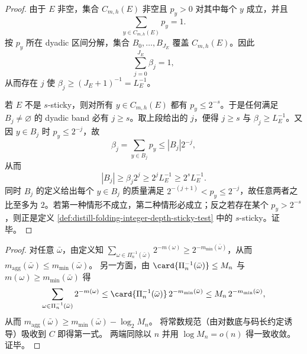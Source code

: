 \begin{proof}
由于 \(E\) 非空，集合 \(C_{m,h}(E)\) 非空且 \(p_y>0\) 对其中每个 \(y\) 成立，并且
\[
\sum_{y\in C_{m,h}(E)}p_y=1.
\]
按 \(p_y\) 所在 dyadic 区间分解，集合 \(B_0,\ldots,B_{J_E}\) 覆盖 \(C_{m,h}(E)\)。因此
\[
\sum_{j=0}^{J_E}\beta_j=1,
\]
从而存在 \(j\) 使 \(\beta_j\ge (J_E+1)^{-1}=L_E^{-1}\)。

若 \(E\) 不是 \(s\)-sticky，则对所有 \(y\in C_{m,h}(E)\) 都有 \(p_y\le2^{-s}\)。于是任何满足 \(B_j\ne\varnothing\) 的 dyadic band 必有 \(j\ge s\)。取上段给出的 \(j\)，便得 \(j\ge s\) 与 \(\beta_j\ge L_E^{-1}\)。又因 \(y\in B_j\) 时 \(p_y\le2^{-j}\)，故
\[
\beta_j=\sum_{y\in B_j}p_y\le |B_j|2^{-j},
\]
从而
\[
|B_j|\ge \beta_j2^j\ge 2^jL_E^{-1}\ge 2^sL_E^{-1}.
\]
同时 \(B_j\) 的定义给出每个 \(y\in B_j\) 的质量满足 \(2^{-(j+1)}<p_y\le2^{-j}\)，故任意两者之比至多为 \(2\)。若第一种情形不成立，第二种情形必成立；反之若存在某个 \(p_y>2^{-s}\)，则正是定义 \ref{def:distill-folding-integer-depth-sticky-test} 中的 \(s\)-sticky。证毕。
\end{proof}

\begin{proof}
对任意 \(\bar\omega\)，由定义知 \(\sum_{\omega\in\Pi_n^{-1}(\bar\omega)}2^{-m(\omega)}\ge 2^{-m_{\min}(\bar\omega)}\)，从而
\(
m_{\mathrm{agg}}(\bar\omega)\le m_{\min}(\bar\omega)
\)。
另一方面，由 \(\card{\Pi_n^{-1}(\bar\omega)}\le M_n\) 与 \(m(\omega)\ge m_{\min}(\bar\omega)\) 得
\[
\sum_{\omega\in\Pi_n^{-1}(\bar\omega)}2^{-m(\omega)}
\le
\card{\Pi_n^{-1}(\bar\omega)}\,2^{-m_{\min}(\bar\omega)}
\le
M_n\,2^{-m_{\min}(\bar\omega)},
\]
从而 \(m_{\mathrm{agg}}(\bar\omega)\ge m_{\min}(\bar\omega)-\log_2 M_n\)。
将常数规范（由对数底与码长约定诱导）吸收到 \(C\) 即得第一式。
两端同除以 \(n\) 并用 \(\log M_n=o(n)\) 得一致收敛。证毕。
\end{proof}
